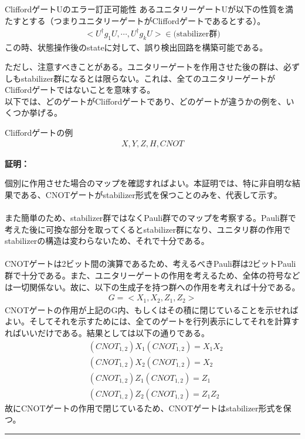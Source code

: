 \documentclass[a4paper,10.5pt]{article}
\numberwithin{equation}{section}
\newenvironment{proofbox}
{\begin{prooflabel}\textbf{証明：}\end{prooflabel}\vspace{0.8em}}
{\par\vspace{1em}\hrule\vspace{1em}}
\begin{document}
\begin{resultbox}{CliffordゲートUのエラー訂正可能性}
    あるユニタリーゲートUが以下の性質を満たすとする（つまりユニタリーゲートがCliffordゲートであるとする）。
    \begin{align*}
        <U^{\dagger}g_{1}U,\cdots ,U^{\dagger}g_{k}U> \in \text{(stabilizer群)}
    \end{align*}
    この時、状態操作後のstateに対して、誤り検出回路を構築可能である。
\end{resultbox}
ただし、注意すべきことがある。ユニタリーゲートを作用させた後の群は、必ずしもstabilizer群になるとは限らない。これは、全てのユニタリーゲートがCliffordゲートではないことを意味する。\\
以下では、どのゲートがCliffordゲートであり、どのゲートが違うかの例を、いくつか挙げる。
\begin{resultbox}{Cliffordゲートの例}
\begin{align*}
    X,Y,Z,H,CNOT
\end{align*}
\end{resultbox}
\begin{proofbox}
    個別に作用させた場合のマップを確認すればよい。本証明では、特に非自明な結果である、CNOTゲートがstabilizer形式を保つことのみを、代表して示す。\\
    \\
    また簡単のため、stabilizer群ではなくPauli群でのマップを考察する。Pauli群で考えた後に可換な部分を取ってくるとstabilizer群になり、ユニタリ群の作用でstabilizerの構造は変わらないため、それで十分である。\\
    \\
    CNOTゲートは2ビット間の演算であるため、考えるべきPauli群は2ビットPauli群で十分である。また、ユニタリーゲートの作用を考えるため、全体の符号などは一切関係ない。故に、以下の生成子を持つ群への作用を考えれば十分である。
    \begin{align*}
        G=<X_{1},X_{2},Z_{1},Z_{2}>
    \end{align*}
    CNOTゲートの作用が上記のG内、もしくはその積に閉じていることを示せればよい。そしてそれを示すためには、全てのゲートを行列表示にしてそれを計算すればいいだけである。結果としては以下の通りである。
    \begin{align*}
        &(CNOT_{1,2})X_{1}(CNOT_{1,2})=X_{1}X_{2}\\
        &(CNOT_{1,2})X_{2}(CNOT_{1,2})=X_{2}\\
        &(CNOT_{1,2})Z_{1}(CNOT_{1,2})=Z_{1}\\
        &(CNOT_{1,2})Z_{2}(CNOT_{1,2})=Z_{1}Z_{2}
    \end{align*}
    故にCNOTゲートの作用で閉じているため、CNOTゲートはstabilizer形式を保つ。
\end{proofbox}
\end{document}
